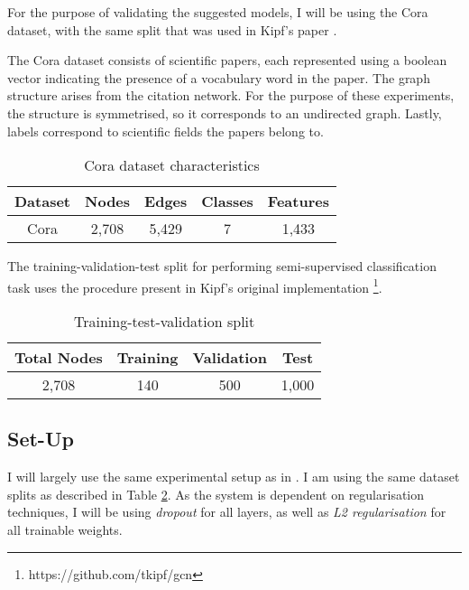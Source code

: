 \documentclass[10pt,a4]{article}
\begin{document}
    For the purpose of validating the suggested models, I will be using the Cora 
    dataset, with the same split that was used in Kipf's paper \cite{kipf2016semi}.
    
    The Cora dataset consists of scientific papers, each represented using a boolean 
    vector indicating the presence of a vocabulary word in the paper. The graph 
    structure arises from the citation network. For the purpose of these experiments, 
    the structure is symmetrised, so it corresponds to an undirected graph. Lastly, labels
    correspond to scientific fields the papers belong to.
    
    \begin{table}
        \centering
        \caption{Cora dataset characteristics}
        \label{tab:datastat}
        \begin{tabular}{c c c c c}
            
            \textbf{Dataset} & \textbf{Nodes} & \textbf{Edges} & \textbf{Classes} & \textbf{Features} \\
            \hline
            Cora    & 2,708 & 5,429 & 7       & 1,433    \\ 
        \end{tabular}
    \end{table}
    
    The training-validation-test split for performing semi-supervised classification 
    task uses the procedure present in Kipf's original implementation 
    \footnote{https://github.com/tkipf/gcn}. 

    \begin{table}[!h]
        \centering
        \caption{Training-test-validation split}
        \label{tab:traintest}
        \begin{tabular}{c c c c}
            
            \textbf{Total Nodes} & \textbf{Training} & \textbf{Validation} & \textbf{Test} \\
            \hline
            2,708 & 140 & 500 & 1,000    \\ 
        \end{tabular}
    \end{table}
    
    \subsection{Set-Up}

    I will largely use the same experimental setup as in \cite{kipf2016semi}. I am 
    using the same dataset splits as described in Table \ref{tab:traintest}. As the 
    system is dependent on regularisation techniques, I will be using 
    \emph{dropout} for all layers, as well as \emph{L2 regularisation} for 
    all trainable weights. 
\end{document}
